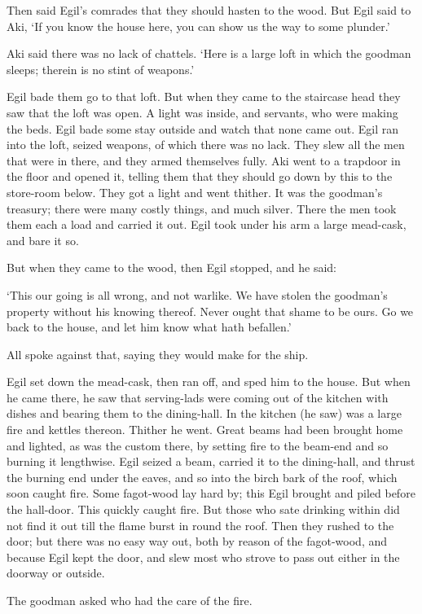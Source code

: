 Then said Egil's comrades that they should hasten to the wood. But Egil said to Aki, `If you know the house here, you can show us the way to some plunder.'

Aki said there was no lack of chattels. `Here is a large loft in which the goodman sleeps; therein is no stint of weapons.'

Egil bade them go to that loft. But when they came to the staircase head they saw that the loft was open. A light was inside, and servants, who were making the beds. Egil bade some stay outside and watch that none came out. Egil ran into the loft, seized weapons, of which there was no lack. They slew all the men that were in there, and they armed themselves fully. Aki went to a trapdoor in the floor and opened it, telling them that they should go down by this to the store-room below. They got a light and went thither. It was the goodman's treasury; there were many costly things, and much silver. There the men took them each a load and carried it out. Egil took under his arm a large mead-cask, and bare it so.

But when they came to the wood, then Egil stopped, and he said:

`This our going is all wrong, and not warlike. We have stolen the goodman's property without his knowing thereof. Never ought that shame to be ours. Go we back to the house, and let him know what hath befallen.'

All spoke against that, saying they would make for the ship.

Egil set down the mead-cask, then ran off, and sped him to the house. But when he came there, he saw that serving-lads were coming out of the kitchen with dishes and bearing them to the dining-hall. In the kitchen (he saw) was a large fire and kettles thereon. Thither he went. Great beams had been brought home and lighted, as was the custom there, by setting fire to the beam-end and so burning it lengthwise. Egil seized a beam, carried it to the dining-hall, and thrust the burning end under the eaves, and so into the birch bark of the roof, which soon caught fire. Some fagot-wood lay hard by; this Egil brought and piled before the hall-door. This quickly caught fire. But those who sate drinking within did not find it out till the flame burst in round the roof. Then they rushed to the door; but there was no easy way out, both by reason of the fagot-wood, and because Egil kept the door, and slew most who strove to pass out either in the doorway or outside.

The goodman asked who had the care of the fire.

